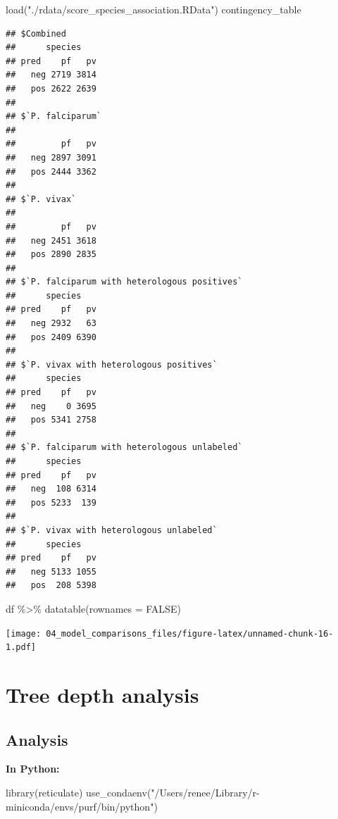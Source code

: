 \documentclass[
  11pt,
  oneside]{book}
\newenvironment{Shaded}{\begin{snugshade}}{\end{snugshade}}
\newcommand{\AttributeTok}[1]{\textcolor[rgb]{0.77,0.63,0.00}{#1}}
\newcommand{\ConstantTok}[1]{\textcolor[rgb]{0.00,0.00,0.00}{#1}}
\newcommand{\FunctionTok}[1]{\textcolor[rgb]{0.00,0.00,0.00}{#1}}
\newcommand{\NormalTok}[1]{#1}
\newcommand{\SpecialCharTok}[1]{\textcolor[rgb]{0.00,0.00,0.00}{#1}}
\newcommand{\StringTok}[1]{\textcolor[rgb]{0.31,0.60,0.02}{#1}}
\begin{document}
\begin{Shaded}
\begin{Highlighting}[]
\FunctionTok{load}\NormalTok{(}\StringTok{"./rdata/score\_species\_association.RData"}\NormalTok{)}
\NormalTok{contingency\_table}
\end{Highlighting}
\end{Shaded}

\begin{verbatim}
## $Combined
##      species
## pred    pf   pv
##   neg 2719 3814
##   pos 2622 2639
## 
## $`P. falciparum`
##      
##         pf   pv
##   neg 2897 3091
##   pos 2444 3362
## 
## $`P. vivax`
##      
##         pf   pv
##   neg 2451 3618
##   pos 2890 2835
## 
## $`P. falciparum with heterologous positives`
##      species
## pred    pf   pv
##   neg 2932   63
##   pos 2409 6390
## 
## $`P. vivax with heterologous positives`
##      species
## pred    pf   pv
##   neg    0 3695
##   pos 5341 2758
## 
## $`P. falciparum with heterologous unlabeled`
##      species
## pred    pf   pv
##   neg  108 6314
##   pos 5233  139
## 
## $`P. vivax with heterologous unlabeled`
##      species
## pred    pf   pv
##   neg 5133 1055
##   pos  208 5398
\end{verbatim}

\begin{Shaded}
\begin{Highlighting}[]
\NormalTok{df }\SpecialCharTok{\%\textgreater{}\%}
  \FunctionTok{datatable}\NormalTok{(}\AttributeTok{rownames =} \ConstantTok{FALSE}\NormalTok{)}
\end{Highlighting}
\end{Shaded}

\texttt{[image: 04\_model\_comparisons\_files/figure-latex/unnamed-chunk-16-1.pdf]}

\hypertarget{tree-depth-analysis}{%
\section{Tree depth analysis}\label{tree-depth-analysis}}

\hypertarget{analysis-3}{%
\subsection{Analysis}\label{analysis-3}}

\textbf{In Python: }

\begin{Shaded}
\begin{Highlighting}[]
\FunctionTok{library}\NormalTok{(reticulate)}
\FunctionTok{use\_condaenv}\NormalTok{(}\StringTok{"/Users/renee/Library/r{-}miniconda/envs/purf/bin/python"}\NormalTok{)}
\end{Highlighting}
\end{Shaded}
\end{document}
